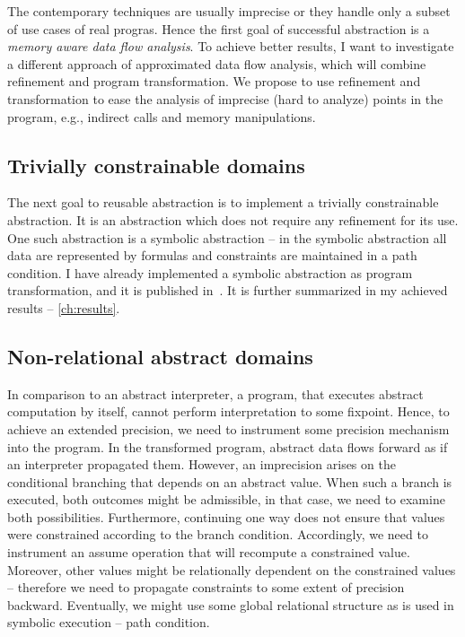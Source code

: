 The contemporary techniques are usually imprecise or they handle only a subset of use
cases of real progras. Hence the first goal of successful abstraction is a
\emph{memory aware data flow analysis}. To achieve better results, I want to
investigate a different approach of approximated data flow analysis, which will
combine refinement and program transformation.  We propose to use refinement
and transformation to ease the analysis of imprecise (hard to analyze) points
in the program, e.g., indirect calls and memory manipulations.

\subsection{Trivially constrainable domains}

The next goal to reusable abstraction is to implement a trivially constrainable
abstraction. It is an abstraction which does not require any refinement for its
use. One such abstraction is a symbolic abstraction -- in the symbolic
abstraction all data are represented by formulas and constraints are maintained
in a path condition. I have already implemented a symbolic abstraction as
program transformation, and it is published in~\cite{Lauko2018SymComp}.
It is further summarized in my achieved results -- \autoref{ch:results}.

\subsection{Non-relational abstract domains}

In comparison to an abstract interpreter, a program, that executes abstract
computation by itself, cannot perform interpretation to some fixpoint. Hence,
to achieve an extended precision, we need to instrument some precision
mechanism into the program. In the transformed program, abstract data flows
forward as if an interpreter propagated them. However, an imprecision arises on
the conditional branching that depends on an abstract value. When such a branch
is executed, both outcomes might be admissible, in that case, we need to
examine both possibilities. 
Furthermore, continuing one way does not ensure that values were constrained
according to the branch condition. Accordingly, we need to instrument an assume
operation that will recompute a constrained value. Moreover, other values might
be relationally dependent on the constrained values -- therefore we need to
propagate constraints to some extent of precision backward. Eventually, we
might use some global relational structure as is used in symbolic execution --
path condition.

